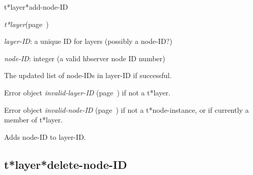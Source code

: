 \begin{description}
\item [Name:]  t*layer*add-node-ID

\item [Class:] {\sl t*layer}\hfill(page~\pageref{t*layer})

\item [Parameters:]
\item {\sl layer-ID}:  a unique ID for layers (possibly a node-ID?)


\item {\sl node-ID}:  
integer (a valid hbserver node ID number)


\item [Return-value:]
The updated list of node-IDs in layer-ID if successful.

Error object {\sl invalid-layer-ID} (page~\pageref{invalid-layer-ID}) if not a t*layer.

Error object {\sl invalid-node-ID} (page~\pageref{invalid-node-ID}) if not a 
t*node-instance, or if currently a member of t*layer.

\item [Description:]

Adds node-ID to layer-ID.

\item [Public:]



\end{description}
\horizontalline

\subsection{t*layer*delete-node-ID}
\label{t*layer*delete-node-ID}

